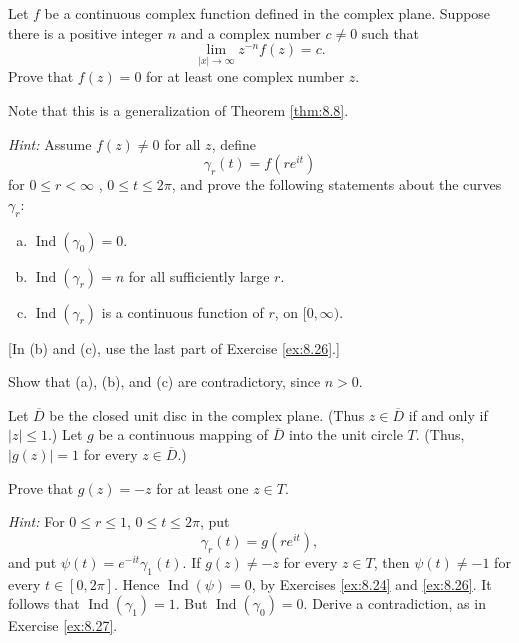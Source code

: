 \begin{myExercise}
    \label{ex:8.27}
    Let $f$ be a continuous complex function defined in the complex plane. 
    Suppose there is a positive integer $n$ and a complex number $c \neq 0$ such that
    \begin{equation*}
        \lim_{|x| \to \infty} z^{-n} f(z) = c.
    \end{equation*}
    Prove that $f(z) = 0$ for at least one complex number $z$.

    Note that this is a generalization of Theorem \ref{thm:8.8}.

    \emph{Hint:} Assume $f(z) \neq 0$ for all $z$, define
    \begin{equation*}
        \gamma_r(t) = f(re^{it})
    \end{equation*}
    for $0 \leq r < \infty$ , $0 \leq t \leq 2\pi$, 
    and prove the following statements about the curves $\gamma_r$:
    \begin{enumerate}[(a)]
        \item $\operatorname{Ind}(\gamma_0)=0$.
        \item $\operatorname{Ind}(\gamma_r)=n$ for all sufficiently large $r$.
        \item $\operatorname{Ind}(\gamma_r)$ is a continuous function of $r$, on $[0, \infty)$.
    \end{enumerate}
    [In (b) and (c), use the last part of Exercise \ref{ex:8.26}.]
    
    Show that (a), (b), and (c) are contradictory, since $n > 0$.
\end{myExercise}


\begin{myExercise}
    \label{ex:8.28}
    Let $\overline{D}$ be the closed unit disc in the complex plane. 
    (Thus $z \in \overline{D}$ if and only if $| z | \leq 1$.) 
    Let $g$ be a continuous mapping of $\overline{D}$ into the unit circle $T$. 
    (Thus, $|g(z)| = 1$ for every $z \in \overline{D}$.)

    Prove that $g(z) = - z$ for at least one $z \in T$.
    
    \emph{Hint:} For $0 \leq r \leq 1$, $0 \leq t \leq 2\pi$, put
    \begin{equation*}
        \gamma_r(t) = g(r e^{it}),
    \end{equation*}
    and put $\psi(t) = e^{-it} \gamma_1(t)$. 
    If $g(z) \neq -z$ for every $z \in T$, 
    then $\psi(t) \neq -1$ for every $t \in [0, 2\pi]$. 
    Hence $\operatorname{Ind} (\psi) = 0$, by Exercises \ref{ex:8.24} and \ref{ex:8.26}.
    It follows that $\operatorname{Ind} (\gamma_1) = 1$.
    But $\operatorname{Ind} (\gamma_0)= 0$. 
    Derive a contradiction, as in Exercise \ref{ex:8.27}.
\end{myExercise}


